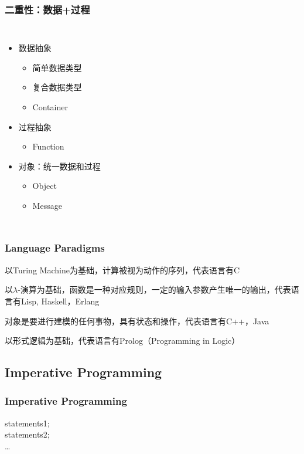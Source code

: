 \begin{frame}
  \frametitle{二重性：数据+过程}
  \begin{columns}
    \begin{itemize}
      \item 数据抽象
        \begin{itemize}
          \item 简单数据类型
          \item 复合数据类型
          \item Container
        \end{itemize}
      \item 过程抽象
        \begin{itemize}
          \item Function
        \end{itemize}
      \item 对象：统一数据和过程
        \begin{itemize}
          \item Object
          \item Message
        \end{itemize}
    \end{itemize}
  \end{columns}
\end{frame}

\begin{frame}
  \frametitle{Language Paradigms}
  \begin{description}[面向对象语言]
    \item [命令式语言] 以Turing Machine为基础，计算被视为动作的序列，代表语言有C
    \item [函数式语言] 以$\lambda$-演算为基础，函数是一种对应规则，一定的输入参数产生唯一的输出，代表语言有Lisp, Haskell，Erlang
    \item [面向对象语言] 对象是要进行建模的任何事物，具有状态和操作，代表语言有C++，Java
    \item [逻辑式语言] 以形式逻辑为基础，代表语言有Prolog（Programming in Logic）
  \end{description}
\end{frame}

\subsection{Imperative Programming}
\begin{frame}
  \frametitle{Imperative Programming}
  statements1;\\
  statements2;\\
  \dots
\end{frame}

